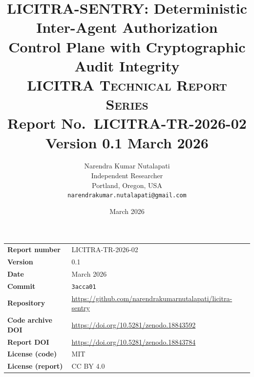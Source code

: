 \documentclass[11pt,a4paper]{article}
\title{%
  \textbf{LICITRA-SENTRY: Deterministic Inter-Agent Authorization\\
  Control Plane with Cryptographic Audit Integrity}\\[16pt]
  \normalsize\textsc{LICITRA Technical Report Series}\\[4pt]
  \normalsize Report No.\ \textbf{LICITRA-TR-2026-02}
  \quad Version \textbf{0.1} \quad March 2026
}
\author{%
  Narendra Kumar Nutalapati\\
  Independent Researcher\\
  Portland, Oregon, USA\\
  \texttt{narendrakumar.nutalapati@gmail.com}
}
\date{March 2026}
\begin{document}
\maketitle
\thispagestyle{fancy}

\begin{center}
\begin{tabular}{@{}ll@{}}
\toprule
\textbf{Report number}    & LICITRA-TR-2026-02 \\
\textbf{Version}           & 0.1 \\
\textbf{Date}              & March 2026 \\
\textbf{Commit}            & \texttt{3acca01} \\
\textbf{Repository}        & \url{https://github.com/narendrakumarnutalapati/licitra-sentry} \\
\textbf{Code archive DOI}  & \url{https://doi.org/10.5281/zenodo.18843592} \\
\textbf{Report DOI}        & \url{https://doi.org/10.5281/zenodo.18843784} \\
\textbf{License (code)}    & MIT \\
\textbf{License (report)}  & CC BY 4.0 \\
\bottomrule
\end{tabular}
\end{center}

\vspace{0.5em}
\end{document}
